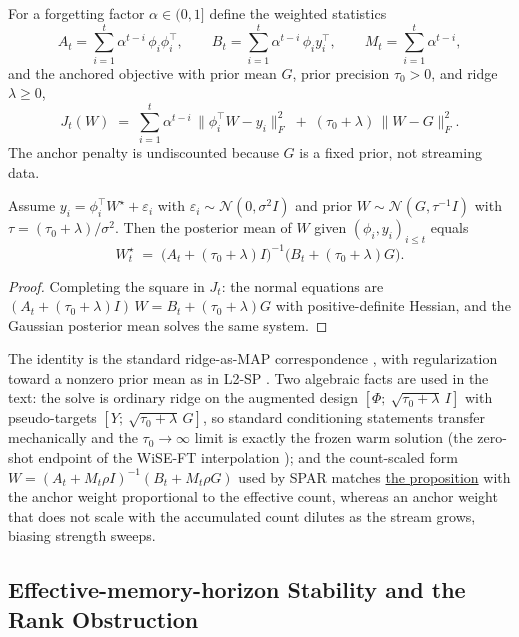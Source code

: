 For a forgetting factor $\alpha \in (0,1]$ define the weighted statistics
\[
  A_t = \sum_{i=1}^t \alpha^{t-i}\,\phi_i\phi_i^\top, \qquad
  B_t = \sum_{i=1}^t \alpha^{t-i}\,\phi_i y_i^\top, \qquad
  M_t = \sum_{i=1}^t \alpha^{t-i},
\]
and the anchored objective with prior mean $G$, prior precision $\tau_0 > 0$, and ridge $\lambda \ge 0$,
\[
  J_t(W) \;=\; \sum_{i=1}^t \alpha^{t-i}\,\|\phi_i^\top W - y_i\|_F^2
  \;+\; (\tau_0 + \lambda)\,\|W - G\|_F^2 .
\]
The anchor penalty is undiscounted because $G$ is a fixed prior, not streaming data.

\begin{proposition}
\label{prop:app-map}
Assume $y_i = \phi_i^\top W^\star + \varepsilon_i$ with $\varepsilon_i \sim \mathcal N(0, \sigma^2 I)$ and prior $W \sim \mathcal N(G, \tau^{-1} I)$ with $\tau = (\tau_0 + \lambda)/\sigma^2$.
Then the posterior mean of $W$ given $(\phi_i, y_i)_{i \le t}$ equals
\[
  W_t^\star \;=\; \bigl(A_t + (\tau_0 + \lambda) I\bigr)^{-1}\bigl(B_t + (\tau_0 + \lambda) G\bigr).
\]
\end{proposition}
\begin{proof}
Completing the square in $J_t$: the normal equations are $(A_t + (\tau_0 + \lambda)I)\,W = B_t + (\tau_0 + \lambda)G$ with positive-definite Hessian, and the Gaussian posterior mean solves the same system.
\end{proof}

The identity is the standard ridge-as-MAP correspondence \citep{hoerl1970,rasmussen2006}, with regularization toward a nonzero prior mean as in L2-SP \citep{li2018l2sp}.
Two algebraic facts are used in the text: the solve is ordinary ridge on the augmented design $[\Phi;\ \sqrt{\tau_0 + \lambda}\,I]$ with pseudo-targets $[Y;\ \sqrt{\tau_0 + \lambda}\,G]$, so standard conditioning statements transfer mechanically and the $\tau_0 \to \infty$ limit is exactly the frozen warm solution (the zero-shot endpoint of the WiSE-FT interpolation \citep{wortsman2022wiseft}); and the count-scaled form $W = (A_t + M_t\rho I)^{-1}(B_t + M_t \rho G)$ used by SPAR matches \hyperref[prop:app-map]{the proposition} with the anchor weight proportional to the effective count, whereas an anchor weight that does not scale with the accumulated count dilutes as the stream grows, biasing strength sweeps.

\subsection{Effective-memory-horizon Stability and the Rank Obstruction}
\label{app:support-emh}

